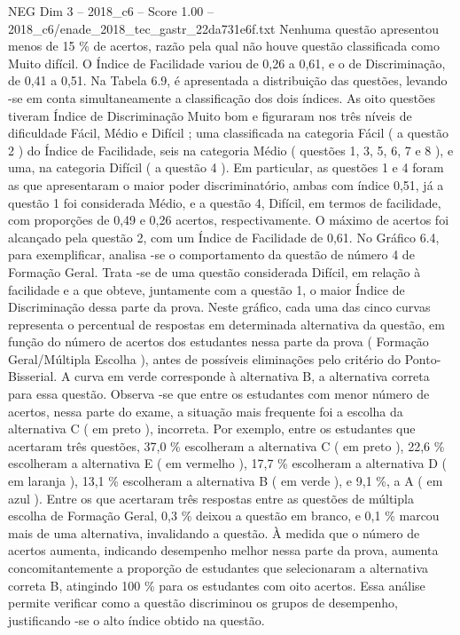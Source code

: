 \begin{textsample}{NEG Dim 3 – 2018\_c6 – Score 1.00 – 2018\_c6/enade\_2018\_tec\_gastr\_22da731e6f.txt}
Nenhuma questão apresentou menos de 15 \% de acertos, razão pela qual não houve questão classificada como Muito difícil.
O Índice de Facilidade variou de 0,26 a 0,61, e o de Discriminação, de 0,41 a 0,51.
Na Tabela 6.9, é apresentada a distribuição das questões, levando -se em conta simultaneamente a classificação dos dois índices.
As oito questões tiveram Índice de Discriminação Muito bom e figuraram nos três níveis de dificuldade Fácil, Médio e Difícil ; uma classificada na categoria Fácil ( a questão 2 ) do Índice de Facilidade, seis na categoria Médio ( questões 1, 3, 5, 6, 7 e 8 ), e uma, na categoria Difícil ( a questão 4 ).
Em particular, as questões 1 e 4 foram as que apresentaram o maior poder discriminatório, ambas com índice 0,51, já a questão 1 foi considerada Médio, e a questão 4, Difícil, em termos de facilidade, com proporções de 0,49 e 0,26 acertos, respectivamente.
O máximo de acertos foi alcançado pela questão 2, com um Índice de Facilidade de 0,61.
No Gráfico 6.4, para exemplificar, analisa -se o comportamento da questão de número 4 de Formação Geral.
Trata -se de uma questão considerada Difícil, em relação à facilidade e a que obteve, juntamente com a questão 1, o maior Índice de Discriminação dessa parte da prova.
Neste gráfico, cada uma das cinco curvas representa o percentual de respostas em determinada alternativa da questão, em função do número de acertos dos estudantes nessa parte da prova ( Formação Geral/Múltipla Escolha ), antes de possíveis eliminações pelo critério do Ponto-Bisserial.
A curva em verde corresponde à alternativa B, a alternativa correta para essa questão.
Observa -se que entre os estudantes com menor número de acertos, nessa parte do exame, a situação mais frequente foi a escolha da alternativa C ( em preto ), incorreta.
Por exemplo, entre os estudantes que acertaram três questões, 37,0 \% escolheram a alternativa C ( em preto ), 22,6 \% escolheram a alternativa E ( em vermelho ), 17,7 \% escolheram a alternativa D ( em laranja ), 13,1 \% escolheram a alternativa B ( em verde ), e 9,1 \%, a A ( em azul ).
Entre os que acertaram três respostas entre as questões de múltipla escolha de Formação Geral, 0,3 \% deixou a questão em branco, e 0,1 \% marcou mais de uma alternativa, invalidando a questão.
À medida que o número de acertos aumenta, indicando desempenho melhor nessa parte da prova, aumenta concomitantemente a proporção de estudantes que selecionaram a alternativa correta B, atingindo 100 \% para os estudantes com oito acertos.
Essa análise permite verificar como a questão discriminou os grupos de desempenho, justificando -se o alto índice obtido na questão.

\end{textsample}
